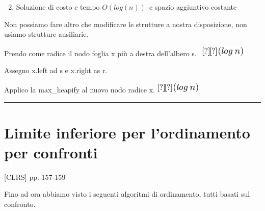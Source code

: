 \documentclass{article}
\providecommand{\tightlist}{%
  \setlength{\itemsep}{0pt}\setlength{\parskip}{0pt}}
\begin{document}
\begin{enumerate}
\setcounter{enumi}{1}
\tightlist
\item
  {Soluzione di costo e tempo }$O(log(n))${~e
  spazio aggiuntivo costante}
\end{enumerate}

{Non possiamo fare altro che modificare le strutture a nostra
disposizione, non usiamo strutture ausiliarie.}

{}

{Prendo come radice il nodo foglia x più a destra dell'albero s.
~}\includegraphics{images/image150.png}

{Assegno x.left ad s e x.right as r.}

{Applico la max\_heapify al nuovo nodo radice x.
}\includegraphics{images/image150.png}

\begin{center}\rule{0.5\linewidth}{\linethickness}\end{center}

{}

\hypertarget{h.7gslm72cwwxs}{\section{\texorpdfstring{{Limite inferiore
per l'ordinamento per
confronti}}{Limite inferiore per l'ordinamento per confronti}}\label{h.7gslm72cwwxs}}

{{[}CLRS{]} pp. 157-159}

{}

{Fino ad ora abbiamo visto i seguenti algoritmi di ordinamento, tutti
basati sul confronto.}

{}

\protect\hypertarget{t.d27200ce3c3d6e65597fb549126b470657d85de0}{}{}\protect\hypertarget{t.26}{}{}
\end{document}
